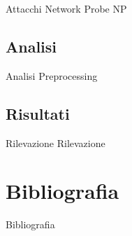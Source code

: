 \documentclass[utf8, a4paper]{beamer}
\begin{document}
		\begin{frame}{Attacchi Network Probe}
			NP
		\end{frame}
	
	\subsection{Analisi}
		\begin{frame}{Analisi}
			Preprocessing
		\end{frame}
	
	\subsection{Risultati}
		\begin{frame}{Rilevazione}
			Rilevazione
		\end{frame}
	
\section*{Bibliografia}	
	\begin{frame}{Bibliografia}
		\nocite{anderson2003introduction,mardia1979multivariate,pandasManual,pandasSite,Labib2006}
		
		
	\end{frame}
\end{document}
